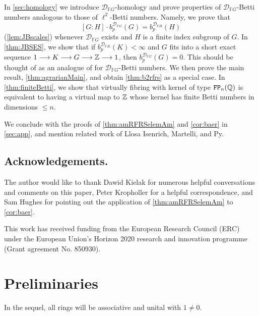 \documentclass[11pt, letterpaper]{amsart}
\begin{document}
In \cref{sec:homology} we introduce $\mathcal{D}_{\mathbb{F}G}$-homology and prove properties of $\mathcal{D}_{\mathbb{F}G}$-Betti numbers analogous to those of $\ell^2$-Betti numbers. Namely, we prove that 
\[
    [G : H] \cdot b_p^{\mathcal{D}_{\mathbb{F}G}}(G) = b_p^{\mathcal{D}_{\mathbb{F}H}}(H)
\]
(\cref{lem:JBscales}) whenever $\mathcal{D}_{\mathbb{F}G}$ exists and $H$ is a finite index subgroup of $G$. In \cref{thm:JBSES}, we show that if $b_p^{\mathcal{D}_{\mathbb{F}K}}(K) < \infty$ and $G$ fits into a short exact sequence $1 \longrightarrow K \longrightarrow G \longrightarrow \mathbb{Z} \longrightarrow 1$, then $b_p^{\mathcal{D}_{\mathbb{F}G}}(G) = 0$. This should be thought of as an analogue of \cite[Theorem 7.2]{Luck02} for $\mathcal{D}_{\mathbb{F}G}$-Betti numbers. We then prove the main result, \cref{thm:agrarianMain}, and obtain \cref{thm:b2rfrs} as a special case. In \cref{thm:finiteBetti}, we show that virtually fibring with kernel of type $\mathtt{FP}_n(\mathbb{Q})$ is equivalent to having a virtual map to $\mathbb{Z}$ whose kernel has finite Betti numbers in dimensions $\leqslant n$.

We conclude with the proofs of \cref{thm:amRFRSelemAm} and \cref{cor:baer} in \cref{sec:app}, and mention related work of Llosa Isenrich, Martelli, and Py.

\subsection*{Acknowledgements.} The author would like to thank Dawid Kielak for numerous helpful conversations and comments on this paper, Peter Kropholler for a helpful correspondence, and Sam Hughes for pointing out the application of \cref{thm:amRFRSelemAm} to \cref{cor:baer}.

This work has received funding from the European Research Council (ERC) under the European Union's Horizon 2020 research and innovation programme (Grant agreement No. 850930).









\section{Preliminaries} \label{sec:prelims}

\begin{rem*}
In the sequel, all rings will be associative and unital with $1 \neq 0$.
\end{rem*}
\end{document}
